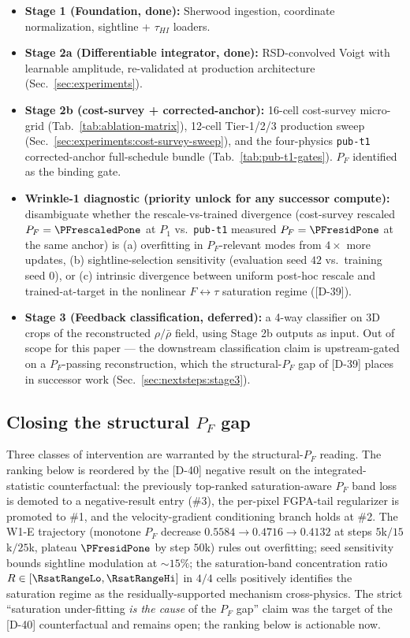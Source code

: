 \begin{itemize}
    \item \textbf{Stage 1 (Foundation, done):} Sherwood ingestion, coordinate normalization, sightline + $\tau_{HI}$ loaders.
    \item \textbf{Stage 2a (Differentiable integrator, done):} RSD-convolved Voigt with learnable amplitude, re-validated at production architecture (Sec.~\ref{sec:experiments}).
    \item \textbf{Stage 2b (cost-survey + corrected-anchor):} 16-cell cost-survey micro-grid (Tab.~\ref{tab:ablation-matrix}), 12-cell Tier-1/2/3 production sweep (Sec.~\ref{sec:experiments:cost-survey-sweep}), and the four-physics \texttt{pub-t1} corrected-anchor full-schedule bundle (Tab.~\ref{tab:pub-t1-gates}). $P_F$ identified as the binding gate.
    \item \textbf{Wrinkle-1 diagnostic (priority unlock for any successor compute):} disambiguate whether the rescale-vs-trained divergence (cost-survey rescaled $P_F=\PFrescaledPone$ at $P_1$ vs.\ \texttt{pub-t1} measured $P_F=\PFresidPone$ at the same anchor) is (a) overfitting in $P_F$-relevant modes from $4\times$ more updates, (b) sightline-selection sensitivity (evaluation seed $42$ vs.\ training seed $0$), or (c) intrinsic divergence between uniform post-hoc rescale and trained-at-target in the nonlinear $F\!\leftrightarrow\!\tau$ saturation regime ([D-39]).
    \item \textbf{Stage 3 (Feedback classification, deferred):} a 4-way classifier on 3D crops of the reconstructed $\rho/\bar\rho$ field, using Stage 2b outputs as input. Out of scope for this paper --- the downstream classification claim is upstream-gated on a $P_F$-passing reconstruction, which the structural-$P_F$ gap of [D-39] places in successor work (Sec.~\ref{sec:nextsteps:stage3}).
\end{itemize}

\subsection{Closing the structural $P_F$ gap}
\label{sec:nextsteps:pf}
Three classes of intervention are warranted by the structural-$P_F$ reading. The ranking below is reordered by the [D-40] negative result on the integrated-statistic counterfactual: the previously top-ranked saturation-aware $P_F$ band loss is demoted to a negative-result entry (\#3), the per-pixel FGPA-tail regularizer is promoted to \#1, and the velocity-gradient conditioning branch holds at \#2. The W1-E trajectory (monotone $P_F$ decrease $0.5584 \to 0.4716 \to 0.4132$ at steps $5$k$/15$k$/25$k, plateau $\PFresidPone$ by step $50$k) rules out overfitting; seed sensitivity bounds sightline modulation at $\sim\!15\%$; the saturation-band concentration ratio $R \in [\RsatRangeLo, \RsatRangeHi]$ in $4/4$ cells positively identifies the saturation regime as the residually-supported mechanism cross-physics. The strict ``saturation under-fitting \emph{is the cause} of the $P_F$ gap'' claim was the target of the [D-40] counterfactual and remains open; the ranking below is actionable now.

